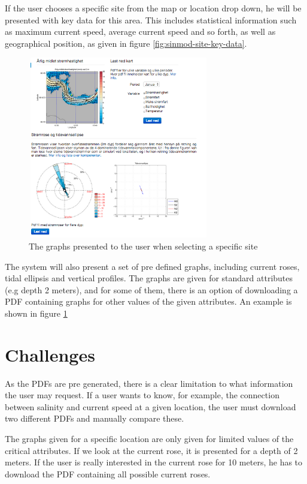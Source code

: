\documentclass[11pt,a4paper,titlepage,oneside]{report}
\begin{document}
If the user chooses a specific site from the map or location drop down, he will be presented with key data for this area. This includes statistical information such as maximum current speed, average current speed and so forth, as well as geographical position, as given in figure \ref{fig:sinmod-site-key-data}.


\begin{figure}[h]
\begin{center}
\includegraphics[height=300px,width=300px]{img/site_graphs.png}
\caption{The graphs presented to the user when selecting a specific site}
\label{fig:sinmod-site-graphs}
\end{center}
\end{figure}

The system will also present a set of pre defined graphs, including current roses, tidal ellipsis and vertical profiles. The graphs are given for standard attributes (e.g depth 2 meters), and for some of them, there is an option of downloading a PDF containing graphs for other values of the given attributes. An example is shown in figure \ref{fig:sinmod-site-graphs}


\section{Challenges}
As the PDFs are pre generated, there is a clear limitation to what information the user may request. If a user wants to know, for example, the connection between salinity and current speed at a given location, the user must download two different PDFs and manually compare these. 

The graphs given for a specific location are only given for limited values of the critical attributes. If we look at the current rose, it is presented for a depth of 2 meters. If the user is really interested in the current rose for 10 meters, he has to download the PDF containing all possible current roses. 
\end{document}
